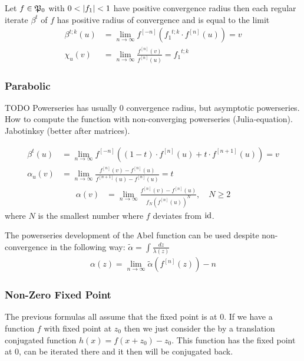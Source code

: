 \documentclass{article}
\numberwithin{equation}{section}
\begin{document}
\begin{proposition}\label{schroeder_radius}
  Let $f\in\mathfrak{P}_0$ with $0<\left|f_1\right|<1$ have positive convergence radius
  then each regular iterate $\beta^t$ of $f$ has positive radius of
  convergence and is equal to the limit
  \begin{align*}
    \beta^{t;k}(u)&=\lim_{n\to\infty} f^{[-n]}\left({f_1}^{t;k}\cdot f^{[n]}(u)\right)=v\\
    \chi_u(v)&=\lim_{n\to\infty}
    \frac{f^{[n]}(v)}{f^{[n]}(u)}={f_1}^{t;k}
  \end{align*}
\end{proposition}

\subsubsection{Parabolic}
\label{sec:Parabolic limit}
TODO Powerseries has usually 0 convergence radius, but asymptotic
powerseries. How to compute the function with non-converging
powerseries (Julia-equation). Jabotinksy (better after matrices).

\begin{align}\label{eq:Levy}
  \beta^t(u)&= \lim_{n\to\infty}f^{[-n]}((1-t)\cdot f^{[n]}(u)+t\cdot f^{[n+1]}(u))=v\\
  \alpha_u(v)&=\lim_{n\to\infty}\frac{f^{[n]}(v) -
    f^{[n]}(u)}{f^{[n+1]}(u)-f^{[n]}(u)}=t
\end{align}
\begin{align}\label{eq:Levy2}
  \alpha(v)&=\lim_{n\to\infty}\frac{f^{[n]}(v)-f^{[n]}(u)}{f_N
    (f^{[n]}(u))^N},\quad N\ge 2
\end{align}
where $N$ is the smallest number where $f$ deviates from $\operatorname{id}$.

The powerseries development of the Abel function can be used despite
non-convergence in the following way:
$\tilde{\alpha}=\int \frac{dz}{\lambda(z)}$
\begin{align}
  \alpha(z)=\lim_{n\to\infty} \tilde{\alpha}(f^{[n]}(z))-n
\end{align}


\subsubsection{Non-Zero Fixed Point}
The previous formulas all assume that the fixed point is at 0. If we
have a function $f$ with fixed point at $z_0$ then we just consider
the by a translation conjugated function $h(x)=f(x+z_0)-z_0$. This
function has the fixed point at 0, can be iterated there and it then
will be conjugated back.
\end{document}
